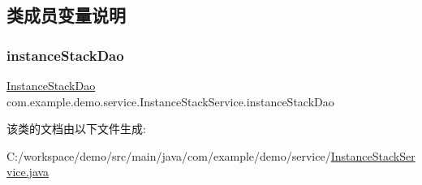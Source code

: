 \subsection{类成员变量说明}
\mbox{\label{classcom_1_1example_1_1demo_1_1service_1_1_instance_stack_service_a433fca150bef7b1da81e8a1d62b56daa}} 
\subsubsection{\texorpdfstring{instance\+Stack\+Dao}{instanceStackDao}}
{\footnotesize\ttfamily \mbox{\hyperlink{interfacecom_1_1example_1_1demo_1_1dao_1_1_instance_stack_dao}{Instance\+Stack\+Dao}} com.\+example.\+demo.\+service.\+Instance\+Stack\+Service.\+instance\+Stack\+Dao\hspace{0.3cm}{\ttfamily [package]}}



该类的文档由以下文件生成\+:\begin{DoxyCompactItemize}
\item 
C\+:/workspace/demo/src/main/java/com/example/demo/service/\mbox{\hyperlink{_instance_stack_service_8java}{Instance\+Stack\+Service.\+java}}\end{DoxyCompactItemize}
